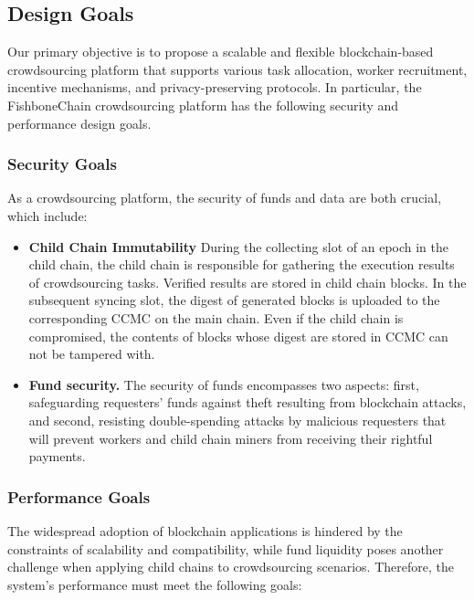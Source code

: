 \documentclass[10pt,journal]{IEEEtran}
\begin{document}
\subsection{Design Goals}\label{subsec:design_goals}

Our primary objective is to propose a scalable and flexible blockchain-based crowdsourcing platform that supports various task allocation, worker recruitment, incentive mechanisms, and privacy-preserving protocols. In particular, the FishboneChain crowdsourcing platform has the following security and performance design goals.

\subsubsection{\textbf{Security Goals}}
As a crowdsourcing platform, the security of funds and data are both crucial, which include:
\begin{itemize}
    \item \textbf{Child Chain Immutability}
            During the collecting slot of an epoch in the child chain, the child chain is responsible for gathering the execution results of crowdsourcing tasks. Verified results are stored in child chain blocks. In the subsequent syncing slot, the digest of generated blocks is uploaded to the corresponding CCMC on the main chain. Even if the child chain is compromised, the contents of blocks whose digest are stored in CCMC can not be tampered with.
    \item \textbf{Fund security.}
          The security of funds encompasses two aspects: first, safeguarding requesters' funds against theft resulting from blockchain attacks, and second, resisting double-spending attacks by malicious requesters that will prevent workers and child chain miners from receiving their rightful payments.
\end{itemize}

\subsubsection{\textbf{Performance Goals}}

The widespread adoption of blockchain applications is hindered by the constraints of scalability and compatibility, while fund liquidity poses another challenge when applying child chains to crowdsourcing scenarios. 
Therefore, the system's performance must meet the following goals:
\end{document}

